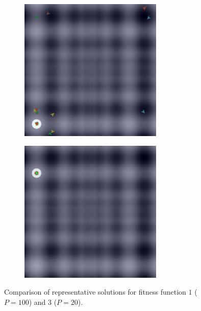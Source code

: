 \documentclass[12pt]{article}
\begin{document}
\begin{figure}
\begin{subfigure}[c]{0.5\textwidth}
\centering
\includegraphics[width=0.75\textwidth]{figures/ex5/f3-3.png}
\end{subfigure}
\begin{subfigure}[c]{0.5\textwidth}
\centering
\includegraphics[width=0.75\textwidth]{figures/ex5/f3-20.png}
\end{subfigure}

\caption{Comparison of representative solutions for fitness function $1$ ($P=100$) and $3$ ($P=20$).}

\end{figure}
\end{document}
